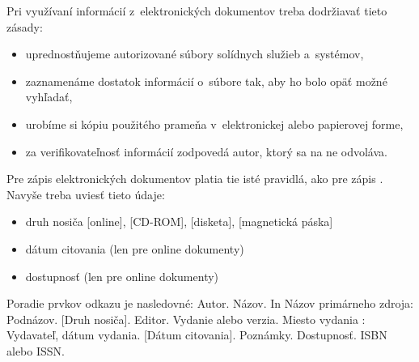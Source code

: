 Pri využívaní informácií z~elektronických dokumentov  treba
dodržiavať tieto zásady:
\begin{itemize}
\item  uprednostňujeme autorizované súbory solídnych služieb
a~systémov,
\item zaznamenáme dostatok informácií o~súbore tak, aby ho bolo opäť
možné vyhľadať,
\item urobíme si kópiu použitého prameňa v~elektronickej alebo
papierovej forme,
\item za verifikovateľnosť informácií zodpovedá autor, ktorý sa na
ne odvoláva.
\end{itemize}

Pre zápis elektronických dokumentov platia tie isté pravidlá, ako pre
zápis . Navyše treba uviesť tieto údaje:
\begin{itemize}
\item  druh nosiča  [online], [CD-ROM], [disketa], [magnetická páska]
\item dátum citovania  (len pre online dokumenty)
\item dostupnosť  (len pre online dokumenty)
\end{itemize}

Poradie prvkov odkazu je nasledovné:
Autor. Názov. In Názov primárneho zdroja: Podnázov. [Druh  nosiča].
Editor. Vydanie alebo verzia. Miesto vydania : Vydavateľ, dátum
vydania. [Dátum citovania]. Poznámky.  Dostupnosť. ISBN alebo ISSN.
